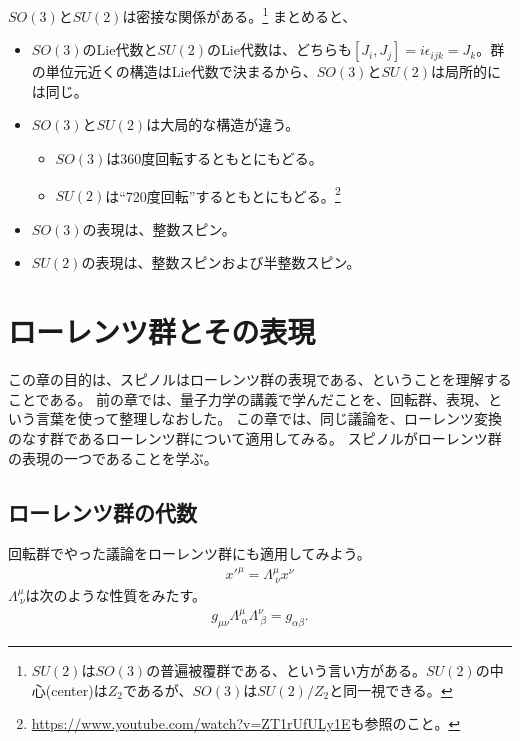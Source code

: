 \documentclass[10pt,a4paper]{jarticle}
\begin{document}
$SO(3)$と$SU(2)$は密接な関係がある。\footnote{
$SU(2)$は$SO(3)$の普遍被覆群である、という言い方がある。$SU(2)$の中心(center)は$Z_2$であるが、$SO(3)$は$SU(2)/Z_2$と同一視できる。
}
まとめると、
\begin{itemize}
\item $SO(3)$のLie代数と$SU(2)$のLie代数は、どちらも$[J_i, J_j] = i\epsilon_{ijk} = J_k$。群の単位元近くの構造はLie代数で決まるから、$SO(3)$と$SU(2)$は局所的には同じ。
\item $SO(3)$と$SU(2)$は大局的な構造が違う。
	\begin{itemize}
	\item $SO(3)$は360度回転するともとにもどる。
	\item $SU(2)$は``720度回転''するともとにもどる。\footnote{\url{https://www.youtube.com/watch?v=ZT1rUfULy1E}も参照のこと。}
	\end{itemize}
\item $SO(3)$の表現は、整数スピン。
\item $SU(2)$の表現は、整数スピンおよび半整数スピン。
\end{itemize}





\section{ローレンツ群とその表現}
この章の目的は、スピノルはローレンツ群の表現である、ということを理解することである。
前の章では、量子力学の講義で学んだことを、回転群、表現、という言葉を使って整理しなおした。
この章では、同じ議論を、ローレンツ変換のなす群であるローレンツ群について適用してみる。
スピノルがローレンツ群の表現の一つであることを学ぶ。

\subsection{ローレンツ群の代数}
回転群でやった議論をローレンツ群にも適用してみよう。
\begin{align}
x'^\mu = \Lambda^\mu_{~\nu} x^\nu
\end{align}
$\Lambda^\mu_{~\nu}$は次のような性質をみたす。
\begin{align}
g_{\mu\nu} \Lambda^\mu_{~\alpha} \Lambda^\nu_{~\beta} = g_{\alpha\beta}.
\end{align}
\end{document}
